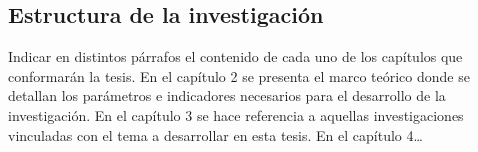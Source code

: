 \subsection{Estructura de la investigación}

Indicar en distintos párrafos el contenido de cada uno de los capítulos que conformarán la tesis.
En el capítulo 2 se presenta el marco teórico donde se detallan los parámetros e indicadores necesarios para el desarrollo de la investigación.
En el capítulo 3 se hace referencia a aquellas investigaciones vinculadas con el tema a desarrollar en esta tesis.
En el capítulo 4…

